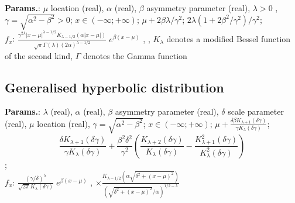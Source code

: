     {\color{darkblue} \textbf{Params.}:} {$\mu$ location (real),  $\alpha$  (real),  $\beta$ asymmetry parameter (real),  $\lambda > 0$ ,  $\gamma = \sqrt{\alpha^2 - \beta^2} > 0 $}; {$x \in (-\infty; +\infty)\!$}; {$\mu + 2 \beta \lambda/ \gamma^2$}; {$2\lambda(1 + 2 \beta^2/\gamma^2)/\gamma^2$};\hspace{0.5cm}\\{\color{darkblue} \textbf{$f_x$}:} {$\frac{\gamma^{2\lambda} | x - \mu|^{\lambda-1/2} K_{\lambda-1/2} \left(\alpha|x - \mu|\right)}{\sqrt{\pi} \Gamma (\lambda)(2 \alpha)^{\lambda-1/2}} \; e^{\beta (x - \mu)}$ , ,  $K_\lambda$ denotes a modified Bessel function of the second kind,  $\Gamma$ denotes the Gamma function}



    
        
\subsection{Generalised hyperbolic distribution}





    {\color{darkblue} \textbf{Params.}:} {$\lambda$  (real),  $\alpha$  (real),  $\beta$ asymmetry parameter (real),  $\delta$ scale parameter (real),  $\mu$ location (real),  $\gamma = \sqrt{\alpha^2 - \beta^2}$}; {$x \in (-\infty; +\infty)\!$}; {$\mu + \frac{\delta \beta K_{\lambda+1}(\delta \gamma)}{\gamma K_\lambda(\delta\gamma)}$}; {$$\frac{\delta K_{\lambda+1}(\delta \gamma)}{\gamma K_\lambda(\delta\gamma)} + \frac{\beta^2\delta^2}{\gamma^2}\left( \frac{K_{\lambda+2}(\delta\gamma)}{K_{\lambda}(\delta\gamma)} -
  \frac{K_{\lambda+1}^2(\delta\gamma)}{K_{\lambda}^2(\delta\gamma)} \right)$$};\hspace{0.5cm}\\{\color{darkblue} \textbf{$f_x$}:} {$\frac{(\gamma/\delta)^\lambda}{\sqrt{2\pi}K_\lambda(\delta \gamma)} \; e^{\beta (x - \mu)} \!$ ,  $\times \frac{K_{\lambda - 1/2}\left(\alpha \sqrt{\delta^2 + (x - \mu)^2}\right)}{\left(\sqrt{\delta^2 + (x - \mu)^2} / \alpha\right)^{1/2 - \lambda}} \!$}



